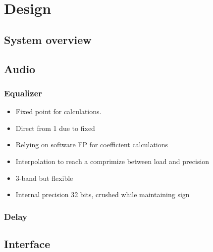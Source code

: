 \documentclass[12p]{article}
\begin{document}
\newpage
\section{Design}
\label{Design}
\subsection{System overview}
\label{Design:SystemOverview}

\subsection{Audio}
\label{Design:Audio}
\subsubsection{Equalizer}


\begin{itemize}
\item Fixed point for calculations.
\item Direct from 1 due to fixed
\item Relying on software FP for coefficient calculations
\item Interpolation to reach a comprimize between load and precision
\item 3-band but flexible
\item Internal precision 32 bits, crushed while maintaining sign
\end{itemize}
\subsubsection{Delay}

\subsection{Interface}
\label{Design:Interface}
\end{document}
